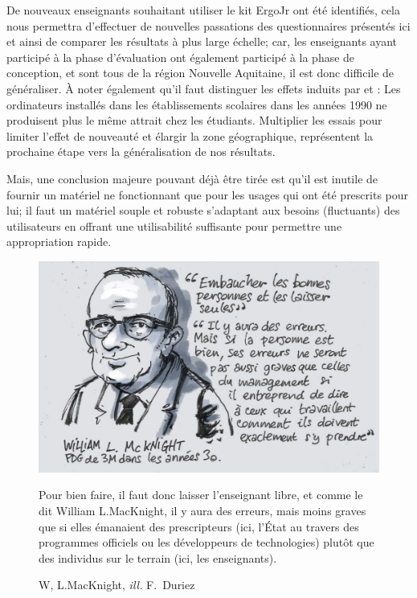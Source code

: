De nouveaux enseignants souhaitant utiliser le kit ErgoJr ont été identifiés, cela nous permettra d'effectuer de nouvelles passations des questionnaires présentés ici et ainsi de comparer les résultats à plus large échelle;
car, les enseignants ayant participé à la phase d'évaluation ont également participé à la phase de conception, et sont tous de la région Nouvelle Aquitaine, il est donc difficile de généraliser.
À noter également qu'il faut distinguer les effets induits par  et : Les ordinateurs installés dans les établissements scolaires dans les années 1990 ne produisent plus le même attrait chez les étudiants.
Multiplier les essais pour limiter l'effet de nouveauté et élargir la zone géographique, représentent la prochaine étape vers la généralisation de nos résultats.\par%
Mais, une conclusion majeure pouvant déjà être tirée est qu'il est inutile de fournir un matériel ne fonctionnant que pour les usages qui ont été prescrits pour lui; il faut un matériel souple et robuste s'adaptant aux besoins (fluctuants) des utilisateurs en offrant une utilisabilité suffisante pour permettre une appropriation rapide. 
\begin{figure}[!h]
    \begin{minipage}{0.5\linewidth}
        \centering
        \includegraphics[width=\linewidth]{Figures/Duriez-motiv5.jpg}
        \caption[W, L.MacKnight, citation]{W, L.MacKnight, \textit{ill.} F.~Duriez~}
        \label{fig:motiv5}
    \end{minipage}
    \hfill
    \begin{minipage}{0.475\linewidth}
    \myDefautStyle
        Pour bien faire, il faut donc laisser l'enseignant libre, et comme le dit William L.MacKnight, il y aura des erreurs, mais moins graves que si elles émanaient des prescripteurs (ici, l'État au travers des programmes officiels ou les développeurs de technologies) plutôt que des individus sur le terrain (ici, les enseignants).\\
    \end{minipage}
\end{figure}\par%
